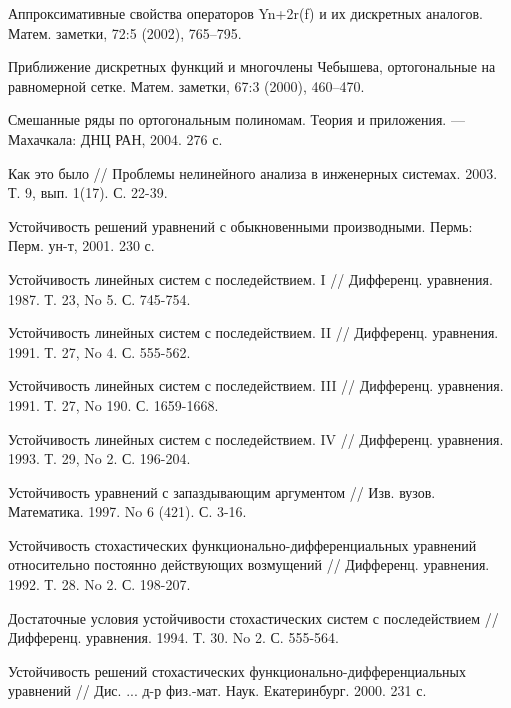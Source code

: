 \begin{thebibliography}{1}
 	Аппроксимативные свойства операторов Yn+2r(f) и их дискретных аналогов. Матем. заметки, 72:5 (2002),  765–795.

 Приближение дискретных функций и многочлены Чебышева, ортогональные на равномерной сетке. Матем. заметки, 67:3 (2000),  460–470.

 Смешанные ряды по ортогональным полиномам. Теория и приложения. --- Махачкала: ДНЦ РАН, 2004. 276 с.

Как это было // Проблемы нелинейного анализа в инженерных системах. 2003. Т. 9, вып. 1(17). С. 22-39.

 Устойчивость решений уравнений с обыкновенными производными. Пермь: Перм. ун-т, 2001. 230 с.

 Устойчивость линейных систем с последействием. I // Дифференц. уравнения. 1987. Т. 23, No 5. С. 745-754.

 Устойчивость линейных систем с последействием. II // Дифференц. уравнения. 1991. Т. 27, No 4. С. 555-562.

 Устойчивость линейных систем с последействием. III // Дифференц. уравнения. 1991. Т. 27, No 190. С. 1659-1668.

 Устойчивость линейных систем с последействием. IV // Дифференц. уравнения. 1993. Т. 29, No 2. С. 196-204.

 Устойчивость уравнений с запаздывающим аргументом // Изв. вузов. Математика. 1997. No 6 (421). С. 3-16.

 Устойчивость стохастических функционально-дифференциальных уравнений относительно постоянно действующих возмущений // Дифференц. уравнения. 1992. Т. 28. No 2. С. 198-207.

 Достаточные условия устойчивости стохастических систем с последействием // Дифференц. уравнения. 1994. Т. 30. No 2. С. 555-564.

 Устойчивость решений стохастических функционально-дифференциальных уравнений // Дис. ... д-р физ.-мат. Наук. Екатеринбург. 2000. 231 с.


\end{thebibliography}
